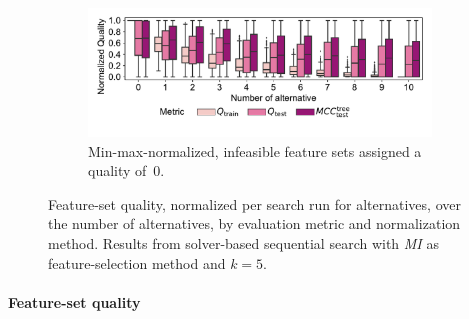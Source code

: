 \documentclass{article}
\theoremstyle{definition}
\begin{document}
\begin{figure}[p]
\begin{subfigure}[t]{\textwidth}
		\label{fig:afs:impact-num-alternatives-quality-min-max}
	\end{subfigure}
	\begin{subfigure}[t]{\textwidth}
		\centering
		\includegraphics[width=\textwidth, trim=14 33 14 16, clip]{plots/afs-impact-num-alternatives-quality-min-max-fillna.pdf}
		\caption{Min-max-normalized, infeasible feature sets assigned a quality of~0.}
		\label{fig:afs:impact-num-alternatives-quality-min-max-fillna}
	\end{subfigure}
	\caption{
		Feature-set quality, normalized per search run for alternatives, over the number of alternatives, by evaluation metric and normalization method.
		Results from solver-based sequential search with \emph{MI} as feature-selection method and $k=5$.
	}
	\label{fig:afs:impact-num-alternatives-quality}
\end{figure}

\paragraph{Feature-set quality}
\end{document}
